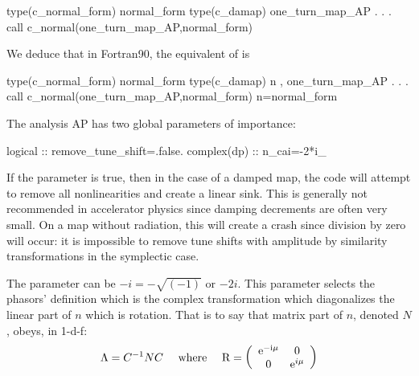\documentclass{hitec}     %
\begin{document}
{{{{{{{{{{{{{{{{{{{\begin{code}
type(c_normal_form) normal_form
type(c_damap)  one_turn_map_AP
	.
	.
	.
call c_normal(one_turn_map_AP,normal_form)
\end{code}

We deduce that in Fortran90,   the equivalent of  is 
\begin{code}
type(c_normal_form) normal_form
type(c_damap) n , one_turn_map_AP
	.
	.
	.
call c_normal(one_turn_map_AP,normal_form)
n=normal_form%
\end{code}


The analysis AP has two global parameters of importance:

\begin{code}
logical :: remove_tune_shift=.false.
complex(dp) :: n_cai=-2*i_
\end{code}
  
If the parameter   is true, then in the case of a damped map, the code will attempt to remove all nonlinearities and create a linear sink. This is generally not recommended in accelerator physics since damping decrements are often very small. On a map without radiation, this will create a crash since division by zero will occur: it is impossible to remove tune shifts with amplitude by similarity transformations in the symplectic case.

The parameter  can be $-i=-\sqrt{(-1)}$ or $-2i$.  This parameter selects the phasors' definition which is the complex transformation which diagonalizes the linear part of $n$ which is  rotation.  That is to say that matrix part  of $n$, denoted $N$, obeys, in 1-d-f:
%
\begin{align} \Lambda =
{C}^{-1}NC~~~~{\rm w}{\rm h}{\rm e}{\rm r}{\rm e}~~~~{\rm R}=\left({\begin{array}{cc}{{\rm e}}^{-{\rm i}\mu }&{\rm 0}\\
{\rm 0}&{{\rm e}}^{i\mu }\end{array}}\right) \end{align}


}}}}}}}}}}}}}}}}}}}
\end{document}
